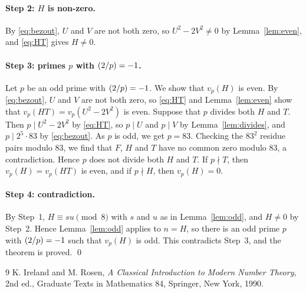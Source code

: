 \documentclass[11pt]{article}
\newcommand{\leg}[2]{\mathchoice{\biggl(\dfrac{#1}{#2}\biggr)}{(#1/#2)}{(#1/#2)}{(#1/#2)}}
\begin{document}
\paragraph{Step 2: $H$ is non-zero.} By \eqref{eq:bezout}, $U$ and $V$ are not both zero, so $U^2-2V^2\neq0$ by Lemma~\ref{lem:even}, and \eqref{eq:HT} gives $H\neq0$.

\paragraph{\texorpdfstring{Step 3: primes $p$ with $\leg{2}{p}=-1$.}{Step 3: inert primes.}} Let $p$ be an odd prime with $\leg{2}{p}=-1$. We show that $v_p(H)$ is even. By \eqref{eq:bezout}, $U$ and $V$ are not both zero, so \eqref{eq:HT} and Lemma~\ref{lem:even} show that $v_p(HT)=v_p(U^2-2V^2)$ is even. Suppose that $p$ divides both $H$ and $T$. Then $p\mid U^2-2V^2$ by \eqref{eq:HT}, so $p\mid U$ and $p\mid V$ by Lemma~\ref{lem:divides}, and $p\mid 2^{5}\cdot 83$ by \eqref{eq:bezout}. As $p$ is odd, we get $p=83$. Checking the $83^2$ residue pairs modulo $83$, we find that $F$, $H$ and $T$ have no common zero modulo $83$, a contradiction. Hence $p$ does not divide both $H$ and $T$. If $p\nmid T$, then $v_p(H)=v_p(HT)$ is even, and if $p\nmid H$, then $v_p(H)=0$.

\paragraph{Step 4: contradiction.} By Step~1, $H\equiv su\pmod{8}$ with $s$ and $u$ as in Lemma~\ref{lem:odd}, and $H\neq0$ by Step~2. Hence Lemma~\ref{lem:odd} applies to $n=H$, so there is an odd prime $p$ with $\leg{2}{p}=-1$ such that $v_p(H)$ is odd. This contradicts Step~3, and the theorem is proved.
\qed

\begin{thebibliography}{9}
 K. Ireland and M. Rosen, \emph{A Classical Introduction to Modern Number Theory}, 2nd ed., Graduate Texts in Mathematics 84, Springer, New York, 1990.
\end{thebibliography}
\end{document}
